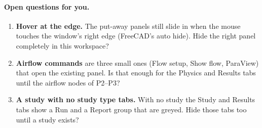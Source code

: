 \paragraph{Open questions for you.}
\begin{enumerate}[nosep]
  \item \textbf{Hover at the edge.} The put-away panels still slide in when the mouse touches the window's right
        edge (FreeCAD's auto hide). Hide the right panel completely in this workspace?
  \item \textbf{Airflow commands} are three small ones (Flow setup, Show flow, ParaView) that open the existing panel.
        Is that enough for the Physics and Results tabs until the airflow nodes of P2--P3?
  \item \textbf{A study with no study type tabs.} With no study the Study and Results tabs show a Run and a Report
        group that are greyed. Hide those tabs too until a study exists?
\end{enumerate}
